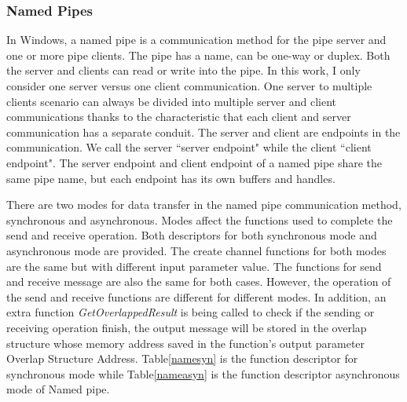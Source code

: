 \subsubsection{Named Pipes}
In Windows, a named pipe is a communication method for the pipe server and one or more pipe clients. The pipe has a name, can be one-way or duplex. Both the server and clients can read or write into the pipe.\cite{WinNamedpipe} In this work, I only consider one server versus one client communication. One server to multiple clients scenario can always be divided into multiple server and client communications thanks to the characteristic that each client and server communication has a separate conduit. The server and client are endpoints in the communication. We call the server ``server endpoint" while the client ``client endpoint".  The server endpoint and client endpoint of a named pipe share the same pipe name, but each endpoint has its own buffers and handles. 

There are two modes for data transfer in the named pipe communication method, synchronous and asynchronous.  Modes affect the functions used to complete the send and receive operation. Both descriptors for both synchronous mode and asynchronous mode are provided. The create channel functions for both modes are the same but with different input parameter value. The functions for send and receive message are also the same for both cases. However, the operation of the send and receive functions are different for different modes. In addition, an extra function \textit{GetOverlappedResult} is being called to check if the sending or receiving operation finish, the output message will be stored in the overlap structure whose memory address saved in the function's output parameter Overlap Structure Address. Table\ref{namesyn} is the function descriptor for synchronous mode while Table\ref{nameasyn} is the function descriptor asynchronous mode of Named pipe.

